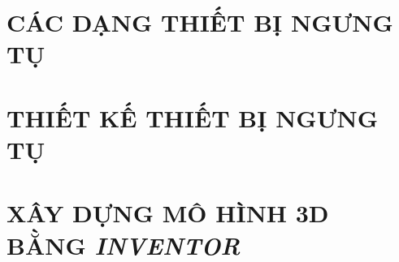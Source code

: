 

\section{CÁC DẠNG THIẾT BỊ NGƯNG TỤ}


\section{THIẾT KẾ THIẾT BỊ NGƯNG TỤ}



\section{XÂY DỰNG MÔ HÌNH 3D BẰNG \textit{INVENTOR}}


